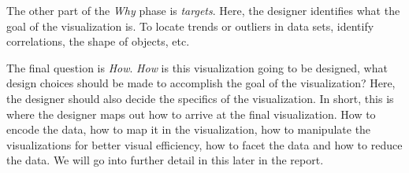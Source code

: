 \documentclass[Report.tex]{subfiles}
\begin{document}
The other part of the \emph{Why} phase is \emph{targets}. Here, the designer identifies what the goal of the visualization is. To locate trends or outliers in data sets, identify correlations, the shape of objects, etc. 

The final question is \emph{How}. \emph{How} is this visualization going to be designed, what design choices should be made to accomplish the goal of the visualization? Here, the designer should also decide the specifics of the visualization. In short, this is where the designer maps out how to arrive at the final visualization. How to encode the data, how to map it in the visualization, how to manipulate the visualizations for better visual efficiency, how to facet the data and how to reduce the data. We will go into further detail in this later in the report.
\end{document}
